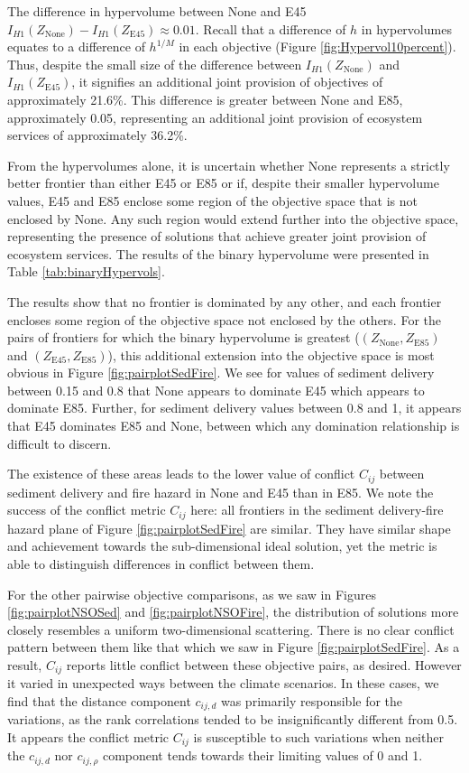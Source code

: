 The difference in hypervolume between None and E45 $I_{H1}(Z_\text{None}) - I_{H1}(Z_\text{E45}) \approx 0.01$. Recall that a difference of $h$ in hypervolumes equates to a difference of $h^{1/M}$ in each objective (Figure \ref{fig:Hypervol10percent}). Thus, despite the small size of the difference between $I_{H1}(Z_\text{None})$ and $I_{H1}(Z_\text{E45})$, it signifies an additional joint provision of objectives of approximately 21.6\%. This difference is greater between None and E85, approximately 0.05, representing an additional joint provision of ecosystem services of approximately 36.2\%.

From the hypervolumes alone, it is uncertain whether None represents a strictly better frontier than either E45 or E85 or if, despite their smaller hypervolume values, E45 and E85 enclose some region of the objective space that is not enclosed by None. Any such region would extend further into the objective space, representing the presence of solutions that achieve greater joint provision of ecosystem services. The results of the binary hypervolume were presented in Table \ref{tab:binaryHypervols}.

The results show that no frontier is dominated by any other, and each frontier encloses some region of the objective space not enclosed by the others. For the pairs of frontiers for which the binary hypervolume is greatest ($(Z_\text{None},Z_\text{E85})$ and $(Z_\text{E45},Z_\text{E85})$), this additional extension into the objective space is most obvious in Figure \ref{fig:pairplotSedFire}. We see for values of sediment delivery between 0.15 and 0.8 that None appears to dominate E45 which appears to dominate E85. Further, for sediment delivery values between 0.8 and 1, it appears that E45 dominates E85 and None, between which any domination relationship is difficult to discern.

The existence of these areas leads to the lower value of conflict $C_{ij}$ between sediment delivery and fire hazard in None and E45 than in E85. We note the success of the conflict metric $C_{ij}$ here: all frontiers in the sediment delivery-fire hazard plane of Figure \ref{fig:pairplotSedFire} are similar. They have similar shape and achievement towards the sub-dimensional ideal solution, yet the metric is able to distinguish differences in conflict between them.

For the other pairwise objective comparisons, as we saw in Figures \ref{fig:pairplotNSOSed} and \ref{fig:pairplotNSOFire}, the distribution of solutions more closely resembles a uniform two-dimensional scattering. There is no clear conflict pattern between them like that which we saw in Figure \ref{fig:pairplotSedFire}. As a result, $C_{ij}$ reports little conflict between these objective pairs, as desired. However it varied in unexpected ways between the climate scenarios. In these cases, we find that the distance component $c_{ij,d}$ was primarily responsible for the variations, as the rank correlations tended to be insignificantly different from 0.5. It appears the conflict metric $C_{ij}$ is susceptible to such variations when neither the $c_{ij,d}$ nor $c_{ij,\rho}$ component tends towards their limiting values of 0 and 1.

